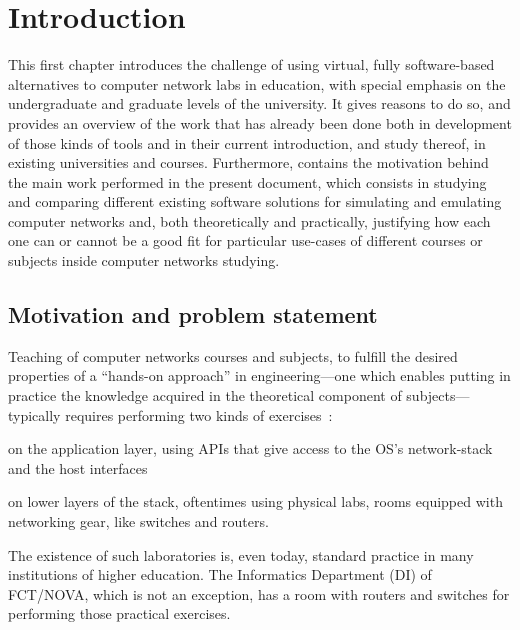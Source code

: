 
\chapter{Introduction}
\label{ch:introduction}

This first chapter introduces the challenge of using virtual, fully software-based alternatives to computer network labs in education, with special emphasis on the undergraduate and graduate levels of the university. %
It gives reasons to do so, and provides an overview of the work that has already been done both in development of those kinds of tools and in their current introduction, and study thereof, in existing universities and courses.
Furthermore, contains the motivation behind the main work performed in the present document, which consists in studying and comparing different existing software solutions for simulating and emulating computer networks and, both theoretically and practically, justifying how each one can or cannot be a good fit for particular use-cases of different courses or subjects inside computer networks studying.

\section{Motivation and problem statement}
\label{sec:motivation}

Teaching of computer networks courses and subjects, to fulfill the desired properties of a ``hands-on approach'' in engineering---one which enables putting in practice the knowledge acquired in the theoretical component of subjects---typically requires performing two kinds of exercises~\cite{problembasedlearning}: %
  \begin{enumerate*}[label=(\roman*), itemjoin={{, }}, itemjoin*={{, and }}]
  \item on the application layer, using APIs that give access to the OS's network-stack and the host interfaces
  \item on lower layers of the stack, oftentimes using physical labs, rooms equipped with networking gear, like switches and routers.
  \end{enumerate*}
The existence of such laboratories is, even today, standard practice in many institutions of higher education.
The Informatics Department (DI) of FCT/NOVA, which is not an exception, has a room with routers and switches for performing those practical exercises.

